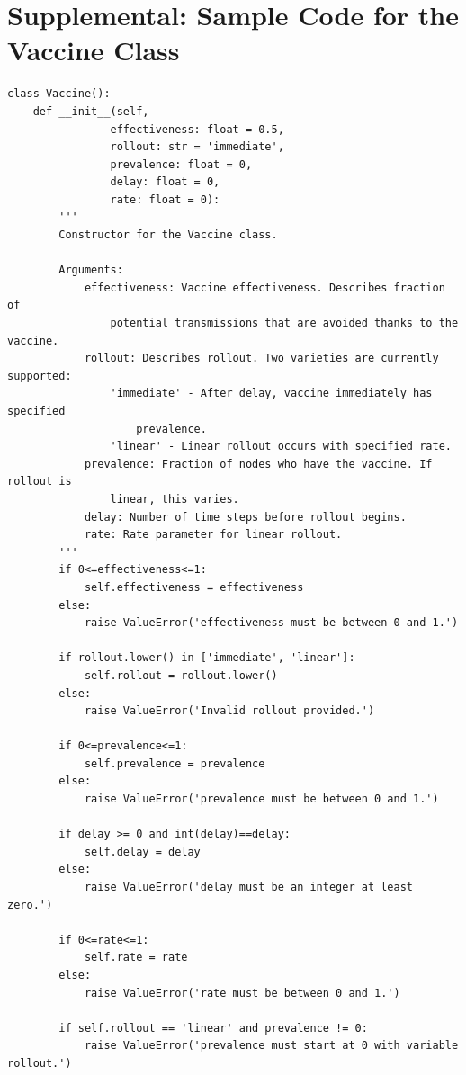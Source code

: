 \documentclass[psamsfonts]{amsart}
\theoremstyle{definition}
\theoremstyle{remark}
\numberwithin{equation}{section}
\begin{document}
\pagebreak

\section{Supplemental: Sample Code for the Vaccine Class}

\begin{verbatim}
class Vaccine():
    def __init__(self,
                effectiveness: float = 0.5,
                rollout: str = 'immediate',
                prevalence: float = 0,
                delay: float = 0,
                rate: float = 0):
        '''
        Constructor for the Vaccine class.

        Arguments:
            effectiveness: Vaccine effectiveness. Describes fraction of
                potential transmissions that are avoided thanks to the vaccine.
            rollout: Describes rollout. Two varieties are currently supported:
                'immediate' - After delay, vaccine immediately has specified
                    prevalence.
                'linear' - Linear rollout occurs with specified rate.
            prevalence: Fraction of nodes who have the vaccine. If rollout is
                linear, this varies.
            delay: Number of time steps before rollout begins.
            rate: Rate parameter for linear rollout.
        '''
        if 0<=effectiveness<=1:
            self.effectiveness = effectiveness
        else:
            raise ValueError('effectiveness must be between 0 and 1.')

        if rollout.lower() in ['immediate', 'linear']:
            self.rollout = rollout.lower()
        else:
            raise ValueError('Invalid rollout provided.')

        if 0<=prevalence<=1:
            self.prevalence = prevalence
        else:
            raise ValueError('prevalence must be between 0 and 1.')

        if delay >= 0 and int(delay)==delay:
            self.delay = delay
        else:
            raise ValueError('delay must be an integer at least zero.')

        if 0<=rate<=1:
            self.rate = rate
        else:
            raise ValueError('rate must be between 0 and 1.')

        if self.rollout == 'linear' and prevalence != 0:
            raise ValueError('prevalence must start at 0 with variable rollout.')

\end{verbatim}
\end{document}
